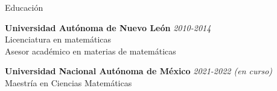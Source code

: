 \documentclass{resume} %
\begin{document}

\begin{rSection}{Educación}

{\bf Universidad Autónoma de Nuevo León} \hfill {\em 2010-2014} \\ 
Licenciatura en matemáticas \\
Asesor académico en materias de matemáticas \smallskip 


{\bf Universidad Nacional Autónoma de México} \hfill {\em 2021-2022 (en curso)} \\
Maestría en Ciencias Matemáticas
\end{rSection}

\end{document}
